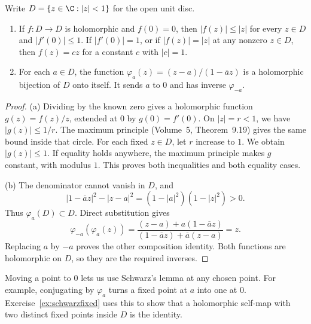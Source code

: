 \begin{lemma}\label{lem:schwarz}
Write $D=\{z\in\C:|z|<1\}$ for the open unit disc.
\begin{enumerate}
\item[(a)] If $f:D\to D$ is holomorphic and $f(0)=0$, then
$|f(z)|\le|z|$ for every $z\in D$ and $|f'(0)|\le1$.
If $|f'(0)|=1$, or if $|f(z)|=|z|$ at any nonzero $z\in D$, then
$f(z)=cz$ for a constant $c$ with $|c|=1$.
\item[(b)] For each $a\in D$, the function
$\varphi_a(z)=(z-a)/(1-\overline a z)$ is a holomorphic bijection of
$D$ onto itself. It sends $a$ to $0$ and has inverse $\varphi_{-a}$.
\end{enumerate}
\end{lemma}
\begin{proof}
(a) Dividing by the known zero gives a holomorphic function
$g(z)=f(z)/z$, extended at $0$ by $g(0)=f'(0)$.
On $|z|=r<1$, we have $|g(z)|\le1/r$. The maximum principle
(Volume~5, Theorem~9.19) gives the same bound inside that circle.
For each fixed $z\in D$, let $r$ increase to $1$. We obtain $|g(z)|\le1$.
If equality holds anywhere, the maximum principle makes $g$ constant,
with modulus $1$. This proves both inequalities and both equality cases.

(b) The denominator cannot vanish in $D$, and
\[
 |1-\overline a z|^2-|z-a|^2=(1-|a|^2)(1-|z|^2)>0.
\]
Thus $\varphi_a(D)\subset D$. Direct substitution gives
\[
 \varphi_{-a}(\varphi_a(z))
 =\frac{(z-a)+a(1-\overline a z)}
 {(1-\overline a z)+\overline a(z-a)}=z.
\]
Replacing $a$ by $-a$ proves the other composition identity.
Both functions are holomorphic on $D$, so they are the required inverses.
\end{proof}

Moving a point to $0$ lets us use Schwarz's lemma at any chosen point.
For example, conjugating by $\varphi_a$ turns a fixed point at $a$ into
one at $0$. Exercise~\ref{ex:schwarzfixed} uses this to show that a
holomorphic self-map with two distinct fixed points inside $D$ is the identity.

